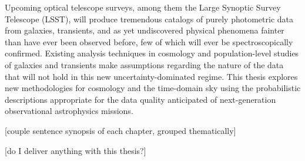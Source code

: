 Upcoming optical telescope surveys, among them the Large Synoptic Survey Telescope (\textsc{LSST}), will produce tremendous catalogs of purely photometric data from galaxies, transients, and as yet undiscovered physical phenomena fainter than have ever been observed before, few of which will ever be spectroscopically confirmed.
Existing analysis techniques in cosmology and population-level studies of galaxies and transients make assumptions regarding the nature of the data that will not hold in this new uncertainty-dominated regime.
This thesis explores new methodologies for cosmology and the time-domain sky using the probabilistic descriptions appropriate for the data quality anticipated of next-generation observational astrophysics missions. 

[couple sentence synopsis of each chapter, grouped thematically]

[do I deliver anything with this thesis?]
